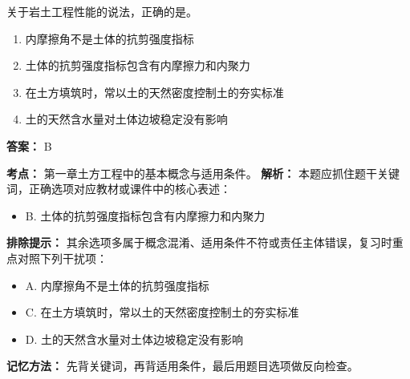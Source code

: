 \documentclass[UTF8,fontset=fandol,11pt]{ctexart}
\begin{document}
\begin{quizbox}[title={第 28 题}]
关于岩土工程性能的说法，正确的是。\\
\begin{enumerate}[label=\Alph*.]
\item 内摩擦角不是土体的抗剪强度指标
\item 土体的抗剪强度指标包含有内摩擦力和内聚力
\item 在土方填筑时，常以土的天然密度控制土的夯实标准
\item 土的天然含水量对土体边坡稳定没有影响
\end{enumerate}
\textbf{答案：} B
\vspace{0.25em}
\begin{answerbox}[title={考点解析}]
\textbf{考点：} 第一章土方工程中的基本概念与适用条件。
\textbf{解析：} 本题应抓住题干关键词，正确选项对应教材或课件中的核心表述：
\begin{itemize}
\item B. 土体的抗剪强度指标包含有内摩擦力和内聚力
\end{itemize}
\textbf{排除提示：} 其余选项多属于概念混淆、适用条件不符或责任主体错误，复习时重点对照下列干扰项：
\begin{itemize}
\item A. 内摩擦角不是土体的抗剪强度指标
\item C. 在土方填筑时，常以土的天然密度控制土的夯实标准
\item D. 土的天然含水量对土体边坡稳定没有影响
\end{itemize}
\textbf{记忆方法：} 先背关键词，再背适用条件，最后用题目选项做反向检查。
\end{answerbox}
\end{quizbox}

\vspace{0.2em}
\end{document}
